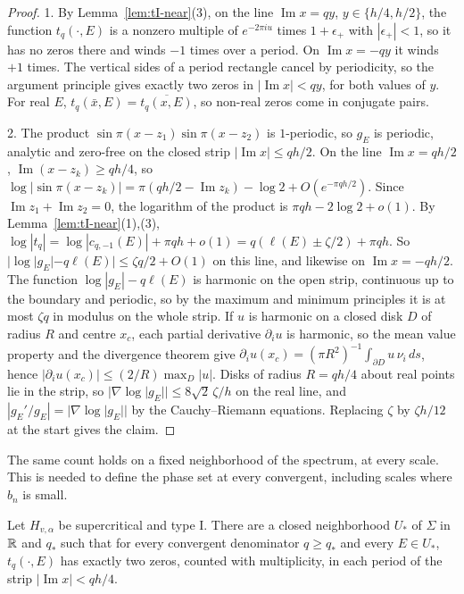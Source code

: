 \begin{proof}
1. By Lemma~\ref{lem:tI-near}(3), on the line $\operatorname{Im}x=qy$, $y\in\{h/4,h/2\}$, the function $t_q(\cdot,E)$ is a nonzero multiple of $e^{-2\pi iu}$ times $1+\epsilon_+$ with $|\epsilon_+|<1$, so it has no zeros there and winds $-1$ times over a period. On $\operatorname{Im}x=-qy$ it winds $+1$ times. The vertical sides of a period rectangle cancel by periodicity, so the argument principle gives exactly two zeros in $|\operatorname{Im}x|<qy$, for both values of $y$. For real $E$, $t_q(\bar x,E)=\overline{t_q(x,E)}$, so non-real zeros come in conjugate pairs.

2. The product $\sin\pi(x-z_1)\sin\pi(x-z_2)$ is $1$-periodic, so $g_E$ is periodic, analytic and zero-free on the closed strip $|\operatorname{Im}x|\le qh/2$. On the line $\operatorname{Im}x=qh/2$, $\operatorname{Im}(x-z_k)\ge qh/4$, so $\log|\sin\pi(x-z_k)|=\pi(qh/2-\operatorname{Im}z_k)-\log2+O(e^{-\pi qh/2})$. Since $\operatorname{Im}z_1+\operatorname{Im}z_2=0$, the logarithm of the product is $\pi qh-2\log2+o(1)$. By Lemma~\ref{lem:tI-near}(1),(3), $\log|t_q|=\log|c_{q,-1}(E)|+\pi qh+o(1)=q(\ell(E)\pm\zeta/2)+\pi qh$. So $|\log|g_E|-q\ell(E)|\le\zeta q/2+O(1)$ on this line, and likewise on $\operatorname{Im}x=-qh/2$. The function $\log|g_E|-q\ell(E)$ is harmonic on the open strip, continuous up to the boundary and periodic, so by the maximum and minimum principles it is at most $\zeta q$ in modulus on the whole strip. If $u$ is harmonic on a closed disk $D$ of radius $R$ and centre $x_c$, each partial derivative $\partial_iu$ is harmonic, so the mean value property and the divergence theorem give $\partial_iu(x_c)=(\pi R^2)^{-1}\int_{\partial D}u\,\nu_i\,ds$, hence $|\partial_iu(x_c)|\le(2/R)\max_D|u|$. Disks of radius $R=qh/4$ about real points lie in the strip, so $|\nabla\log|g_E||\le8\sqrt2\,\zeta/h$ on the real line, and $|g_E'/g_E|=|\nabla\log|g_E||$ by the Cauchy--Riemann equations. Replacing $\zeta$ by $\zeta h/12$ at the start gives the claim.
\end{proof}

The same count holds on a fixed neighborhood of the spectrum, at every scale. This is needed to define the phase set at every convergent, including scales where $b_n$ is small.

\begin{lemma}\label{lem:tI-fixed}
Let $H_{v,\alpha}$ be supercritical and type I. There are a closed neighborhood $U_*$ of $\Sigma$ in $\mathbb R$ and $q_*$ such that for every convergent denominator $q\ge q_*$ and every $E\in U_*$, $t_q(\cdot,E)$ has exactly two zeros, counted with multiplicity, in each period of the strip $|\operatorname{Im}x|<qh/4$.
\end{lemma}


